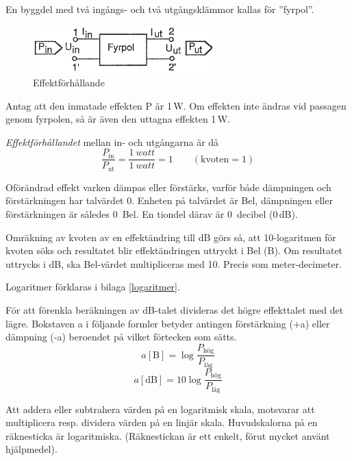 En byggdel med två ingångs- och två utgångsklämmor kallas för ''fyrpol''.

\begin{figure}[ht]
	\centering
	\includegraphics[width=7cm]{images/cropped_pdfs/bild_2_1-32.pdf}
	\caption{Effektförhållande}
	\label{fig:BildII1-32}
\end{figure}

Antag att den inmatade effekten P är 1\,W.
Om effekten inte ändras vid passagen genom fyrpolen, så är även den uttagna
effekten 1\,W.

\emph{Effektförhållandet} mellan in- och utgångarna är då
\begin{equation*}
	\frac{P_{\mathrm{in}}}{P_{\mathrm{ut}}} = 
	\frac{\SI{1}{watt}}{\SI{1}{watt}} = 1 \qquad (\mathrm{kvoten} = 1)
\end{equation*}

Oförändrad effekt varken dämpas eller förstärks, varför både dämpningen och
förstärkningen har talvärdet 0.
Enheten på talvärdet är Bel, dämpningen eller förstärkningen är således 0~Bel.
En tiondel därav är 0~decibel (0\,dB).

Omräkning av kvoten av en effektändring till dB görs så, att 10-logaritmen för
kvoten söks och resultatet blir effektändringen uttryckt i Bel (B). Om
resultatet uttrycks i dB, ska Bel-värdet multipliceras med 10. Precis som meter-decimeter.

Logaritmer förklaras i bilaga \ref{logaritmer}.

För att förenkla beräkningen av dB-talet divideras det högre effekttalet med det
lägre. Bokstaven a i följande formler betyder antingen förstärkning (+a) eller
dämpning (-a) beroendet på vilket förtecken som sätts.
\begin{equation*}
	a\mathrm{[B]} = \log \dfrac{P_\text{hög}}{P_\text{låg}}
\end{equation*}
\begin{equation*}
	a\mathrm{[dB]} = 10\log \dfrac{P_\text{hög}}{P_\text{låg}}
\end{equation*}

Att addera eller subtrahera värden på en logaritmisk skala, motsvarar att
multiplicera resp. dividera värden på en linjär skala.
Huvudskalorna på en räknesticka är logaritmiska.
(Räknestickan är ett enkelt, förut mycket använt hjälpmedel).

